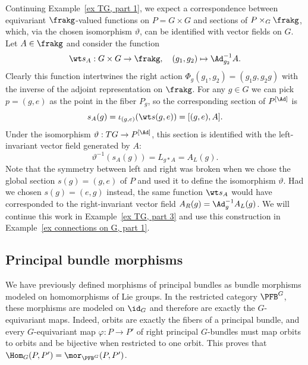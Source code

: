 \begin{example}\label{ex TG, part 2}
    Continuing Example~\ref{ex TG, part 1}, we expect a correspondence between equivariant $\frakg$-valued functions on $P=G\times G$ and sections of $P\times_G \frakg$, which, via the chosen isomorphism $\vartheta$, can be identified with vector fields on $G$. Let $A\in\frakg$ and consider the function
    \[\wt s_A:G\times G\to \frakg,\quad (g_1,g_2)\mapsto \Ad_{g_2}^{-1}A.\]
    Clearly this function intertwines the right action $\Phi_g(g_1,g_2)=(g_1g,g_2g)$ with the inverse of the adjoint representation on $\frakg$. For any $g\in G$ we can pick $p=(g,e)$ as the point in the fiber $P_g$, so the corresponding section of $P^{[\Ad]}$ is 
    \[s_A(g)=\iota_{(g,e)}(\wt s(g,e))=[(g,e),A].\]
    Under the isomorphism $\vartheta:TG\to P^{[\Ad]}$, this section is identified with the left-invariant vector field generated by $A$:
    \[\vartheta^{-1}(s_A(g))=L_{g\ast A}=A_L(g).\]
    Note that the symmetry between left and right was broken when we chose the global section $s(g)=(g,e)$ of $P$ and used it to define the isomorphism $\vartheta$. Had we chosen $s(g)=(e,g)$ instead, the same function $\wt s_A$ would have corresponded to the right-invariant vector field $A_R(g)=\Ad_g^{-1} A_L(g)$. We will continue this work in Example~\ref{ex TG, part 3} and use this construction in Example~\ref{ex connections on G, part 1}.
\end{example}






\subsection{Principal bundle morphisms}


We have previously defined morphisms of principal bundles as bundle morphisms modeled on homomorphisms of Lie groups. In the restricted category $\PFB^G$, these morphisms are modeled on $\id_G$ and therefore are exactly the $G$-equivariant maps. Indeed, orbits are exactly the fibers of a principal bundle, and every $G$-equivariant map $\varphi:P\to P'$ of right principal $G$-bundles must map orbits to orbits and be bijective when restricted to one orbit. This proves that $\Hom_G(P,P')=\mor_{\PFB^G}(P,P')$.

